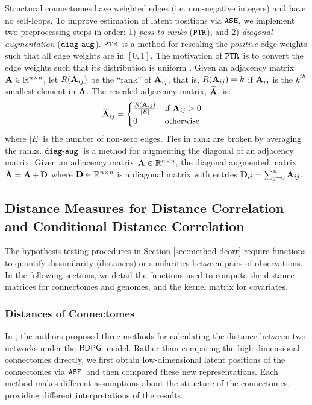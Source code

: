 Structural connectomes have weighted edges (i.e. non-negative integers) and have no self-loops. To improve estimation of latent positions via $\operatorname{\mathtt{ASE}}$, we implement two preprocessing steps in order: 1) \textit{pass-to-ranks} ($\operatorname{\mathtt{PTR}}$), and 2) \textit{diagonal augmentation} ($\operatorname{\mathtt{diag-aug}}$). $\operatorname{\mathtt{PTR}}$\ is a method for rescaling the \textit{positive} edge weights such that all edge weights are in $[0, 1]$. The motivation of $\operatorname{\mathtt{PTR}}$\ is to convert the edge weights such that its distribution is uniform \cite{Kiar188706, tang2018connectome}. Given an adjacency matrix $\operatorname{\mathbf{A}} \in \mathbb{R}^{n\times n}$, let $R(\operatorname{\mathbf{A}}_{ij})$ be the ``rank'' of $\operatorname{\mathbf{A}}_{ij}$, that is, $R(\operatorname{\mathbf{A}}_{ij}) = k$ if $\operatorname{\mathbf{A}}_{ij}$ is the $k^{th}$ smallest element in $\operatorname{\mathbf{A}}$. The rescaled adjacency matrix, $\widetilde{\operatorname{\mathbf{A}}}$, is:
\begin{align*}
    \widetilde{\operatorname{\mathbf{A}}}_{ij} &= \begin{cases}
    \frac{R(\operatorname{\mathbf{A}}_{ij})}{|E|} & \text{if $\operatorname{\mathbf{A}}_{ij} > 0$}\\
    0 & \text{otherwise}
    \end{cases}
\end{align*}
where $|E|$ is the number of non-zero edges. Ties in rank are broken by averaging the ranks. $\operatorname{\mathtt{diag-aug}}$\ is a method for augmenting the diagonal of an adjacency matrix. Given an adjacency matrix $\operatorname{\mathbf{A}} \in \mathbb{R}^{n\times n}$, the diagonal augmented matrix $\bar{\operatorname{\mathbf{A}}}=\operatorname{\mathbf{A}} + \operatorname{\mathbf{D}}$  where $\operatorname{\mathbf{D}}\in\mathbb{R}^{n\times n}$ is a diagonal matrix with entries $\operatorname{\mathbf{D}}_{ii} = \sum_{j=0}^n \operatorname{\mathbf{A}}_{ij}$.

\subsection{Distance Measures for Distance Correlation and Conditional Distance Correlation} 
The hypothesis testing procedures in Section \ref{sec:method-dcorr} require functions to quantify dissimilarity (distances) or similarities between pairs of observations. In the following sections, we detail the functions used to compute the distance matrices for connectomes and genomes, and the kernel matrix for covariates. 

\subsubsection{Distances of Connectomes}\label{sec:method-connectome-models}
In \cite{tang2017}, the authors proposed three methods for calculating the distance between two networks under the $\operatorname{\mathsf{RDPG}}$\ model. Rather than comparing the high-dimensional connectomes directly, we first obtain low-dimensional latent positions of the connectomes via $\operatorname{\mathtt{ASE}}$\ and then compared these new representations. Each method makes different assumptions about the structure of the connectomes, providing different interpretations of the results.

